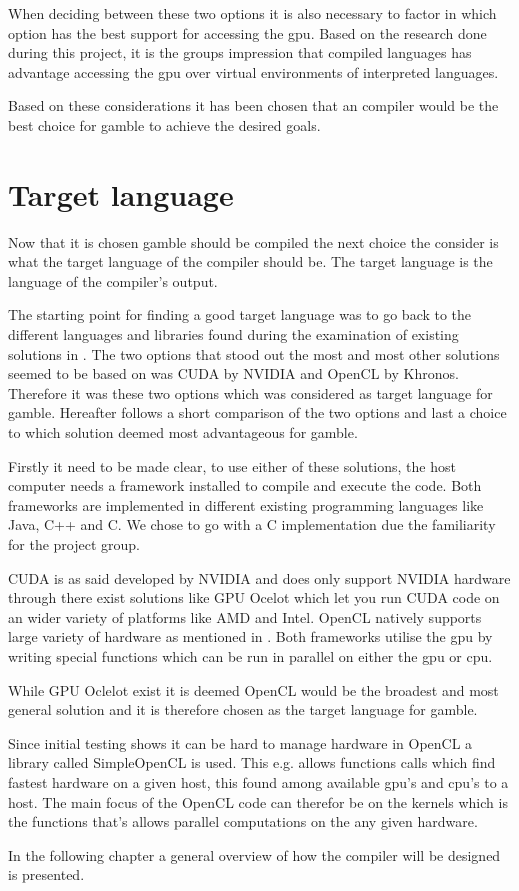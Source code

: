 When deciding between these two options it is also necessary to factor in which option has the best support for accessing the \gls{gpu}.
Based on the research done during this project, it is the groups impression that compiled languages has advantage accessing the \gls{gpu} over virtual environments of interpreted languages.

Based on these considerations it has been chosen that an compiler would be the best choice for \gls{gamble} to achieve the desired goals.

\section{Target language}
Now that it is chosen \gls{gamble} should be compiled the next choice the consider is what the target language of the compiler should be.
The target language is the language of  the compiler's output.

The starting point for finding a good target language was to go back to the different languages and libraries found during the examination of existing solutions in .
The two options that stood out the most and most other solutions seemed to be based on was CUDA by NVIDIA and OpenCL by Khronos.
Therefore it was these two options which was considered as target language for \gls{gamble}.
Hereafter follows a short comparison of the two options and last a choice to which solution deemed most advantageous for \gls{gamble}.

Firstly it need to be made clear, to use either of these solutions, the host computer needs a framework installed to compile and execute the code.
Both frameworks are implemented in different existing programming languages like Java, C++ and C.
We chose to go with a C implementation due the familiarity for the project group.

CUDA is as said developed by NVIDIA and does only support NVIDIA hardware through there exist solutions like GPU Ocelot which let you run CUDA code on an wider variety of platforms like AMD and Intel.\citep{Diamos:2010:ODO:1854273.1854318}
OpenCL natively supports large variety of hardware as mentioned in .
Both frameworks utilise the \gls{gpu} by writing special functions which can be run in parallel on either the \gls{gpu} or \gls{cpu}.

While GPU Oclelot exist it is deemed OpenCL would be the broadest and most general solution and it is therefore chosen as the target language for \gls{gamble}.

Since initial testing shows it can be hard to manage hardware in OpenCL a library called SimpleOpenCL is used.
This e.g. allows functions calls which find fastest hardware on a given host, this found among available \gls{gpu}'s and \gls{cpu}'s to a host.\citep{simpecl}
The main focus of the OpenCL code can therefor be on the kernels which is the functions that's allows parallel computations on the any given hardware.

In the  following chapter a general overview of how the compiler will be designed is presented.